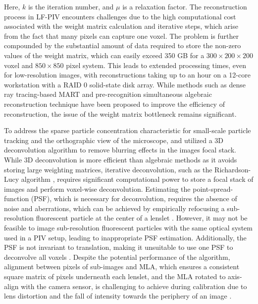 \documentclass[draftthesis,fullpage]{uiucthesis}
\begin{document}
Here, $k$ is the iteration number, and $\mu$ is a relaxation factor. The reconstruction process in LF-PIV encounters challenges due to the high computational cost associated with the weight matrix calculation and iterative steps, which arise from the fact that many pixels can capture one voxel. The problem is further compounded by the substantial amount of data required to store the non-zero values of the weight matrix, which can easily exceed 350 GB for a $300 \times 200 \times 200$ voxel and $850 \times 850$ pixel system. This leads to extended processing times, even for low-resolution images, with reconstructions taking up to an hour on a 12-core workstation with a RAID 0 solid-state disk array. While methods such as dense ray tracing-based MART \citep{shi2017light} and pre-recognition simultaneous algebraic reconstruction technique \citep{zhu2021pre} have been proposed to improve the efficiency of reconstruction, the issue of the weight matrix bottleneck remains significant.

To address the sparse particle concentration characteristic for small-scale particle tracking and the orthographic view of the microscope, \citet{levoy2006light} and \citet{truscott2017three} utilized a 3D deconvolution algorithm to remove blurring effects in the images focal stack. While 3D deconvolution is more efficient than algebraic methods as it avoids storing large weighting matrices, iterative deconvolution, such as the Richardson-Lucy algorithm \citep{sibarita2005deconvolution}, requires significant computational power to store a focal stack of images and perform voxel-wise deconvolution. Estimating the point-spread-function (PSF), which is necessary for deconvolution, requires the absence of noise and aberrations, which can be achieved by empirically refocusing a sub-resolution fluorescent particle at the center of a lenslet \citep{levoy2006light}. However, it may not be feasible to image sub-resolution fluorescent particles with the same optical system used in a PIV setup, leading to inappropriate PSF estimation. Additionally, the PSF is not invariant to translation, making it unsuitable to use one PSF to deconvolve all voxels \citep{zhu2021pre}. Despite the potential performance of the algorithm, alignment between pixels of sub-images and MLA, which ensures a consistent square matrix of pixels underneath each lenslet, and the MLA rotated to axis-align with the camera sensor, is challenging to achieve during calibration due to lens distortion and the fall of intensity towards the periphery of an image \citep{piller2012microscope}.
\end{document}
